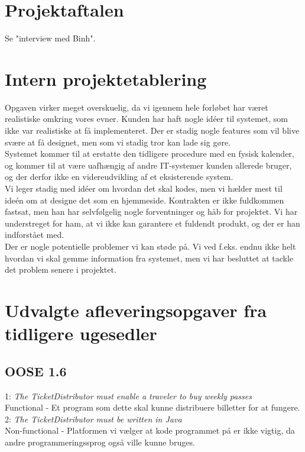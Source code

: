 \documentclass{article}
\begin{document}
\section{Projektaftalen}
Se "interview med Binh".

\section{Intern projektetablering}

Opgaven virker meget overskuelig, da vi igennem hele forløbet har været realistiske omkring vores evner. Kunden har haft nogle idéer til systemet, som ikke var realistiske at få implementeret. Der er stadig nogle features som vil blive svære at få designet, men som vi stadig tror kan lade sig gøre.  \\
Systemet kommer til at erstatte den tidligere procedure med en fysisk kalender, og kommer til at være uafhængig af andre IT-systemer kunden allerede bruger, og der derfor ikke en videreudvikling af et eksisterende system. \\
Vi leger stadig med idéer om hvordan det skal kodes, men vi hælder mest til ideén om at designe det som en hjemmeside. 
Kontrakten er ikke fuldkommen fastsat, men han har selvfølgelig nogle forventninger og håb for projektet. Vi har understreget for ham, at vi ikke kan garantere et fuldendt produkt, og der er han indforstået med.  \\
Der er nogle potentielle problemer vi kan støde på. Vi ved f.eks. endnu ikke helt hvordan vi skal gemme information fra systemet, men vi har besluttet at tackle det problem senere i projektet.\\
\section{Udvalgte afleveringsopgaver fra tidligere ugesedler}

\subsection{OOSE 1.6}
1: \textit{The TicketDistributor must enable a traveler to buy weekly passes} \\
Functional - Et program som dette skal kunne distribuere billetter for at fungere. \\

2: \textit{The TicketDistributor must be written in Java} \\
Non-functional - Platformen vi vælger at kode programmet på er ikke vigtig, da andre programmeringssprog også ville kunne bruges. \\
\end{document}
